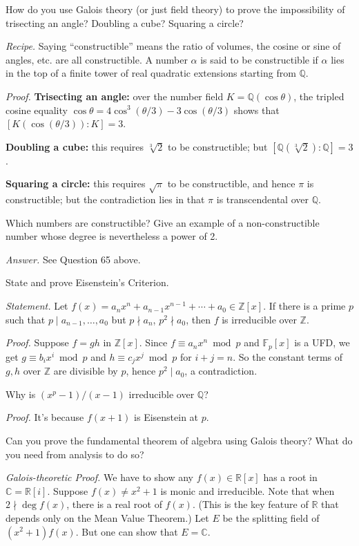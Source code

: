 \documentclass{mathproblems}
\newcommand\Q{\mathbb{Q}}
\newcommand\R{\mathbb{R}}
\newcommand\C{\mathbb{C}}
\newcommand\Z{\mathbb{Z}}
\newcommand\F{\mathbb{F}}
\begin{document}
\begin{questions}
\miquestion
{\color{blue} How do you use Galois theory (or just field theory) to prove the impossibility of trisecting an angle? Doubling a cube? Squaring a circle?}

{\color{violet}
\textit{Recipe.} Saying ``constructible'' means the ratio of volumes, the cosine or sine of angles, etc. are all constructible. A number $\alpha$ is said to be constructible if $\alpha$ lies in the top of a finite tower of real quadratic extensions starting from $\Q$.
}

\textit{Proof.} \textbf{Trisecting an angle:} over the number field $K=\Q(\cos\theta)$, the tripled cosine equality $\cos\theta=4\cos^3(\theta/3)-3\cos(\theta/3)$ shows that $[K(\cos(\theta/3)):K]=3$.

\textbf{Doubling a cube:} this requires $\sqrt[3]{2}$ to be constructible; but $[\Q(\sqrt[3]{2}):\Q]=3$.

\textbf{Squaring a circle:} this requires $\sqrt{\pi}$ to be constructible, and hence $\pi$ is constructible; but the contradiction lies in that $\pi$ is transcendental over $\Q$.

\miquestion
{\color{blue} Which numbers are constructible? Give an example of a non-constructible number whose degree is nevertheless a power of 2.}

\textit{Answer.} See Question 65 above.

\miquestion
{\color{blue} State and prove Eisenstein's Criterion.}

\textit{Statement.}
Let $f(x)=a_n x^n+a_{n-1}x^{n-1}+\cdots+a_0\in \Z[x]$. If there is a prime $p$ such that $p\mid a_{n-1},\ldots,a_0$ but $p \nmid a_n$, $p^2\nmid a_0$, then $f$ is irreducible over $\Z$.

\textit{Proof.}
Suppose $f=g h$ in $\Z[x]$. Since $f\equiv a_n x^n\bmod p$ and $\F_p[x]$ is a UFD, we get $g\equiv b_i x^i\bmod p$ and $h\equiv c_j x^j\bmod p$ for $i+j=n$. So the constant terms of $g,h$ over $\Z$ are divisible by $p$, hence $p^2\mid a_0$, a contradiction.

\miquestion
{\color{blue} Why is $(x^{p}-1)/(x-1)$ irreducible over $\Q$?}

\textit{Proof.}
It's because $f(x+1)$ is Eisenstein at $p$.

\miquestion
{\color{blue} Can you prove the fundamental theorem of algebra using Galois theory? What do you need from analysis to do so?}

\textit{Galois-theoretic Proof.} We have to show any $f(x)\in \R[x]$ has a root in $\C=\R[i]$. Suppose $f(x)\neq x^2+1$ is monic and irreducible. Note that when $2\nmid \deg f(x)$, there is a real root of $f(x)$. (This is the key feature of $\R$ that depends only on the Mean Value Theorem.) Let $E$ be the splitting field of $(x^2+1)f(x)$. But one can show that $E=\C$.


\end{questions}
\end{document}
